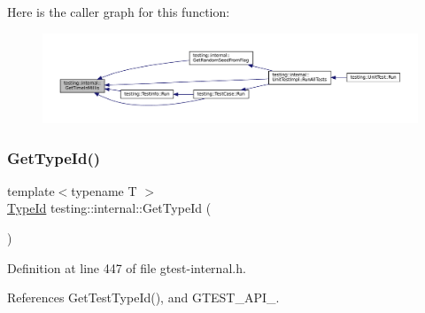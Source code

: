 Here is the caller graph for this function\+:
\nopagebreak
\begin{figure}[H]
\begin{center}
\leavevmode
\includegraphics[width=350pt]{namespacetesting_1_1internal_ae66b46943a429e6efb1db456d4cae90c_icgraph}
\end{center}
\end{figure}
\mbox{\label{namespacetesting_1_1internal_a6b108e56fdc68ea937ffb3759fb55ab0}} 
\subsubsection{\texorpdfstring{Get\+Type\+Id()}{GetTypeId()}}
{\footnotesize\ttfamily template$<$typename T $>$ \\
\hyperlink{namespacetesting_1_1internal_ab1114197d3c657d8b7f8e0c5caa12d00}{Type\+Id} testing\+::internal\+::\+Get\+Type\+Id (\begin{DoxyParamCaption}{ }\end{DoxyParamCaption})}



Definition at line 447 of file gtest-\/internal.\+h.



References Get\+Test\+Type\+Id(), and G\+T\+E\+S\+T\+\_\+\+A\+P\+I\+\_\+.


